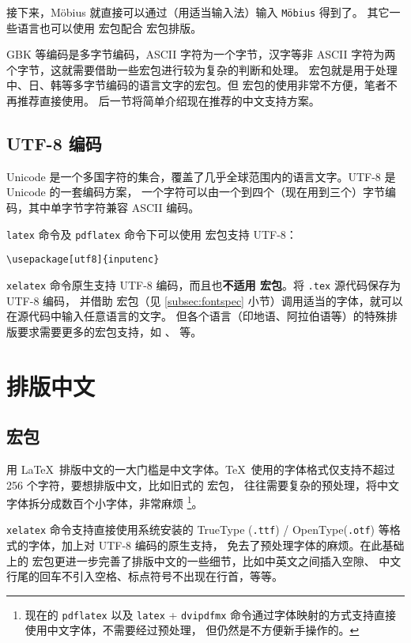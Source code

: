 接下来，M\"obius 就直接可以通过（用适当输入法）输入 \texttt{M\"obius} 得到了。
其它一些语言也可以使用  宏包配合  宏包排版。

GBK 等编码是多字节编码，ASCII 字符为一个字节，汉字等非 ASCII 字符为两个字节，这就需要借助一些宏包进行较为复杂的判断和处理。
 宏包就是用于处理中、日、韩等多字节编码的语言文字的宏包。但  宏包的使用非常不方便，笔者不再推荐直接使用。
后一节将简单介绍现在推荐的中文支持方案。

\subsection{UTF-8 编码}\label{subsec:utf8}

Unicode 是一个多国字符的集合，覆盖了几乎全球范围内的语言文字。UTF-8 是 Unicode 的一套编码方案，
一个字符可以由一个到四个（现在用到三个）字节编码，其中单字节字符兼容 ASCII 编码。

\texttt{latex} 命令及 \texttt{pdflatex} 命令下可以使用  宏包支持 UTF-8：
\begin{verbatim}
\usepackage[utf8]{inputenc}
\end{verbatim}

\texttt{xelatex} 命令原生支持 UTF-8 编码，而且也\textbf{不适用  宏包}。将 \texttt{.tex} 源代码保存为 UTF-8 编码，
并借助  宏包（见 \ref{subsec:fontspec} 小节）调用适当的字体，就可以在源代码中输入任意语言的文字。
但各个语言（印地语、阿拉伯语等）的特殊排版要求需要更多的宏包支持，如 、  等。

\section{排版中文}\label{sec:chinese}

\subsection{ 宏包}\label{subsec:xeCJK}

用 \LaTeX\ 排版中文的一大门槛是中文字体。\TeX\ 使用的字体格式仅支持不超过 256 个字符，要想排版中文，比如旧式的  宏包，
往往需要复杂的预处理，将中文字体拆分成数百个小字体，非常麻烦%
\footnote{现在的 \texttt{pdflatex} 以及 \texttt{latex} + \texttt{dvipdfmx} 命令通过字体映射的方式支持直接使用中文字体，不需要经过预处理，
但仍然是不方便新手操作的。}。

\texttt{xelatex} 命令支持直接使用系统安装的 TrueType (\texttt{.ttf}) / OpenType(\texttt{.otf}) 等格式的字体，加上对 UTF-8 编码的原生支持，
免去了预处理字体的麻烦。在此基础上的  宏包更进一步完善了排版中文的一些细节，比如中英文之间插入空隙、
中文行尾的回车不引入空格、标点符号不出现在行首，等等。

